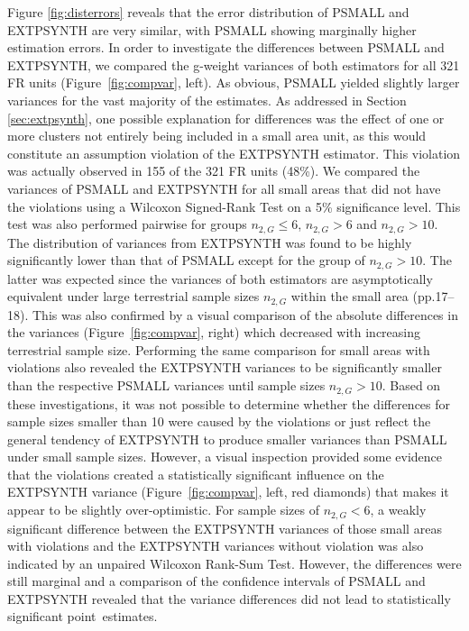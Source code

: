 \documentclass[remotesensing,article,accept,moreauthors,pdftex,10pt,a4paper]{Definitions/mdpi}
\newcommand{\psmall}{PSMALL}
\newcommand{\extpsynth}{EXTPSYNTH}
\begin{document}
Figure \ref{fig:disterrors} reveals that the error distribution of \psmall{} and \extpsynth{} are very similar, with \psmall{} showing marginally higher estimation errors. In order to investigate the differences between \psmall{} and \extpsynth{}, we compared the g-weight variances of both estimators for all 321 FR units (Figure~\ref{fig:compvar}, left). As obvious, \psmall{} yielded slightly larger variances for the vast majority of the estimates. As addressed in Section \ref{sec:extpsynth}, one possible explanation for differences was the effect of one or more clusters not entirely being included in a small area unit, as this would constitute an assumption violation of the \extpsynth{} estimator. This violation was actually observed in 155 of the 321 FR units (48\%). We compared the variances of \psmall{} and \extpsynth{} for all small areas that did not have the violations using a Wilcoxon Signed-Rank Test \citep{wilcoxon1970} on a 5\% significance level. This test was also performed pairwise for groups $n_{2,G} \leq 6$, $n_{2,G} > 6$ and $n_{2,G} > 10$. The distribution of variances from \extpsynth{} was found to be highly significantly lower than that of \psmall{} except for the group of $n_{2,G} > 10$. The latter was expected since the variances of both estimators are asymptotically equivalent under large terrestrial sample sizes $n_{2,G}$ within the small area \citep{mandallaz2016} (pp.17--18). This was also confirmed by a visual comparison of the absolute differences in the variances (Figure~\ref{fig:compvar}, right) which decreased with increasing terrestrial sample size. Performing the same comparison for small areas with violations also revealed the \extpsynth{} variances to be significantly smaller than the respective \psmall{} variances until sample sizes $n_{2,G} > 10$. Based on these investigations, it was not possible to determine whether the differences for sample sizes smaller than 10 were caused by the violations or just reflect the general tendency of \extpsynth{} to produce smaller variances than \psmall{} under small sample sizes. However, a visual inspection provided some evidence that the violations created a statistically significant influence on the \extpsynth{} variance (Figure~\ref{fig:compvar}, left, red diamonds) that makes it appear to be slightly over-optimistic. For sample sizes of $n_{2,G} < 6$, a weakly significant difference between the \extpsynth{} variances of those small areas with violations and the \extpsynth{} variances without violation was also indicated by an unpaired Wilcoxon Rank-Sum Test. However, the differences were still marginal and a comparison of the confidence intervals of \psmall{} and \extpsynth{} revealed that the variance differences did not lead to statistically significant point~estimates.
\end{document}
